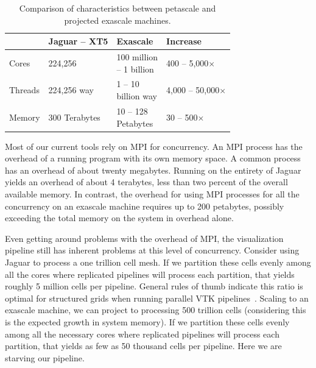 \documentclass{vgtc}                          %
\newcommand*{\lcite}[1]{~\cite{#1}}
\begin{document}
\begin{table}[htbp]
  \centering
  \caption{Comparison of characteristics between petascale and projected
    exascale machines.}
  \label{table:PetaExaCompare}
  \vspace{6pt}
  \begin{tabular}{llll}
    & Jaguar -- XT5 & Exascale & Increase \\
    \hline
    Cores & 224,256
    & \parbox{.7in}{\vspace*{2pt}100 million\\ \hspace*{6pt} -- 1 billion\vspace*{2pt}}
    & 400 -- 5,000$\times$ \\
    Threads & 224,256 way
    & \parbox{.7in}{\vspace*{2pt}1 -- 10\\\hspace*{6pt}billion way\vspace*{2pt}}
    & \parbox{.65in}{\vspace*{2pt}4,000\\ \hspace*{6pt} -- 50,000$\times$\vspace*{2pt}} \\
    Memory & 300 Terabytes
    & \parbox{.7in}{\vspace*{2pt}10 -- 128\\\hspace*{6pt} Petabytes\vspace*{2pt}}
    & 30 -- 500$\times$
  \end{tabular}
\end{table}

Most of our current tools rely on MPI for concurrency.  An MPI process has
the overhead of a running program with its own memory space.  A common
process has an overhead of about twenty megabytes.  Running on the entirety
of Jaguar yields an overhead of about 4 terabytes, less than two percent of
the overall available memory.  In contrast, the overhead for using MPI
processes for all the concurrency on an exascale machine requires up to 200
petabytes, possibly exceeding the total memory on the system in overhead
alone.

Even getting around problems with the overhead of MPI, the visualization
pipeline still has inherent problems at this level of concurrency.
Consider using Jaguar to process a one trillion cell mesh.  If we partition
these cells evenly among all the cores where replicated pipelines will
process each partition, that yields roughly 5 million cells per pipeline.
General rules of thumb indicate this ratio is optimal for structured grids
when running parallel VTK pipelines\lcite{ParaViewTutorial}.  Scaling to an
exascale machine, we can project to processing 500 trillion cells
(considering this is the expected growth in system memory).  If we
partition these cells evenly among all the necessary cores where
replicated pipelines will process each partition, that yields as few as 50
thousand cells per pipeline.  Here we are starving our pipeline.
\end{document}
